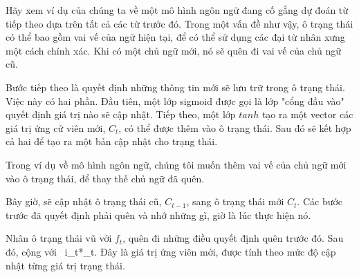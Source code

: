 Hãy xem ví dụ của chúng ta về một mô hình ngôn ngữ đang cố gắng dự đoán từ tiếp theo dựa trên tất cả các từ trước đó.
Trong một vấn đề như vậy, ô trạng thái có thể bao gồm vai vế của ngữ hiện tại, để có thể sử dụng các đại từ nhân xưng
một cách chính xác. Khi có một chủ ngữ mới, nó sẽ quên đi vai vế của chủ ngữ cũ.

\begin{figure}[!htb]
\end{figure}

Bước tiếp theo là quyết định những thông tin mới sẽ lưu trữ trong ô trạng thái. Việc này có hai phần. Đầu tiên,
một lớp sigmoid được gọi là lớp "cổng đầu vào" quyết định giá trị nào sẽ cập nhật. Tiếp theo, một lớp \(tanh\)
tạo ra một vector các giá trị ứng cử viên mới, \(C_t\), có thể được thêm vào ô trạng thái. Sau đó sẽ kết hợp  cả hai
để tạo ra một bản cập nhật cho trạng thái.

Trong ví dụ về mô hình ngôn ngữ, chúng tôi muốn thêm vai vế của chủ ngữ mới vào ô trạng thái, để thay thế chủ ngữ đã
quên.
\begin{figure}[!htb]
\end{figure}

Bây giờ, sẽ cập nhật ô trạng thái cũ, \(C_{t-1}\), sang ô trạng thái mới \(C_{t}\). Các bước trước đã quyết định phải
quên và nhớ những gì, giờ là lúc thực hiện nó.

Nhân ô trạng thái vũ với \(f_t\), quên đi những điều quyết định quên trước đó. Sau đó, cộng với \
i_t*_t\).
Đây là giá trị ứng viên mới, được tính theo mức độ cập nhật từng giá trị trạng thái.

